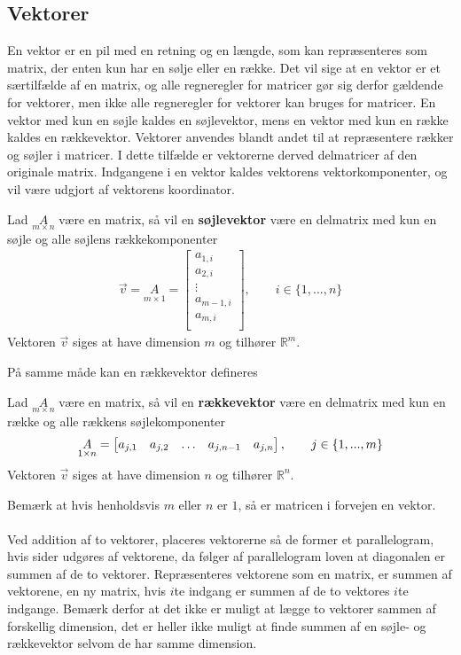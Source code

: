 \subsection{Vektorer}
En vektor er en pil med en retning og en længde, som kan repræsenteres som matrix, der enten kun har en sølje eller en række.
Det vil sige at en vektor er et særtilfælde af en matrix, og alle regneregler for matricer gør sig derfor gældende for vektorer, men ikke alle regneregler for vektorer kan bruges for matricer.
En vektor med kun en søjle kaldes en søjlevektor, mens en vektor med kun en række kaldes en rækkevektor.
Vektorer anvendes blandt andet til at repræsentere  rækker og søjler i matricer. 
I dette tilfælde er vektorerne derved delmatricer af den originale matrix.
Indgangene i en vektor kaldes vektorens vektorkomponenter, og vil være udgjort af vektorens koordinator.



\begin{defn}[Søjlevektor]
Lad $\underset{m \times n}{A}$ være en matrix, så vil en \textbf{søjlevektor} være en delmatrix med kun en søjle og alle søjlens rækkekomponenter
\begin{align*}
\vec{v}=\underset{m \times 1}{A} = 
\begin{bmatrix}
a_{1,i}\\
a_{2,i}\\
\vdots \\
a_{m-1,i}\\
a_{m,i} \\
\end{bmatrix},\qquad  i\in \{1,...,n\}
\end{align*}
Vektoren $\vec{v}$ siges at have dimension $m$ og tilhører  $\mathds{R}^m$.
\end{defn}

På samme måde kan en rækkevektor defineres


\begin{defn}[Rækkevektor]
Lad $\underset{m \times n}{A}$ være en matrix, så vil en \textbf{rækkevektor} være en delmatrix med kun en række og alle rækkens søjlekomponenter
\begin{align*}
\underset{1 \times n}{A} = 
\begin{bmatrix} a_{j,1} & a_{j,2} & \dots & a_{j,n-1} & a_{j,n} \end{bmatrix},
\qquad  j\in \{1,...,m\}
\end{align*}
Vektoren $\vec{v}$ siges at have dimension $n$ og tilhører $\mathds{R}^n$.
\end{defn}
Bemærk at hvis henholdsvis $m$ eller $n$ er $1$, så er matricen i forvejen en vektor.\\
\\
Ved addition af to vektorer, placeres vektorerne så de former et parallelogram, hvis sider udgøres af vektorene, da følger af parallelogram loven at diagonalen er summen af de to vektorer.
Repræsenteres  vektorene som en matrix, er summen af vektorene, en ny matrix, hvis $i$te indgang er summen af de to vektores $i$te indgange. 
Bemærk derfor at det ikke er muligt at lægge to vektorer sammen af forskellig dimension, det er heller ikke muligt at finde summen af en søjle- og rækkevektor selvom de har samme dimension.

